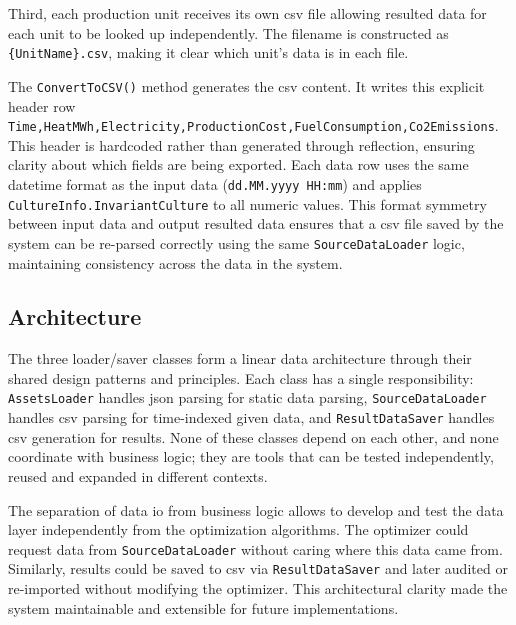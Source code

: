 Third, each production unit receives its own \acrshort{csv} file allowing resulted data for each unit to be looked up independently.
The filename is constructed as \texttt{\{UnitName\}.csv}, making it clear which unit's data is in each file.

The \texttt{ConvertToCSV()} method generates the \acrshort{csv} content. It writes this explicit header
row \texttt{Time,HeatMWh,Electricity,ProductionCost,FuelConsumption,Co2\-Emissions}.
This header is hardcoded rather than generated through reflection, ensuring clarity
about which fields are being exported. Each data row uses the same datetime format as the input data (\texttt{dd.MM.yyyy HH:mm})
and applies \texttt{CultureInfo.Invariant\-Culture} to all numeric values. This format symmetry between input data
and output resulted data ensures that a \acrshort{csv} file saved by the system can be re-parsed correctly using the same \texttt{SourceDataLoader} logic,
maintaining consistency across the data in the system.

\subsection{Architecture}

The three loader/saver classes form a linear data architecture through their shared design patterns and principles.
Each class has a single responsibility: \texttt{AssetsLoader} handles \acrshort{json} parsing for static data parsing,
\texttt{SourceDataLoader} handles \acrshort{csv} parsing for time-indexed given data, and \texttt{ResultDataSaver} handles \acrshort{csv} generation for results.
None of these classes depend on each other, and none coordinate with business logic; they are tools that can be tested independently,
reused and expanded in different contexts.

The separation of data \acrshort{io} from business logic allows to develop and test the data layer independently
from the optimization algorithms. The optimizer could request data from \texttt{SourceDataLoader} without caring where this data came from.
Similarly, results could be saved to \acrshort{csv} via \texttt{ResultDataSaver} and later audited or re-imported without modifying the optimizer.
This architectural clarity made the system maintainable and extensible for future implementations.